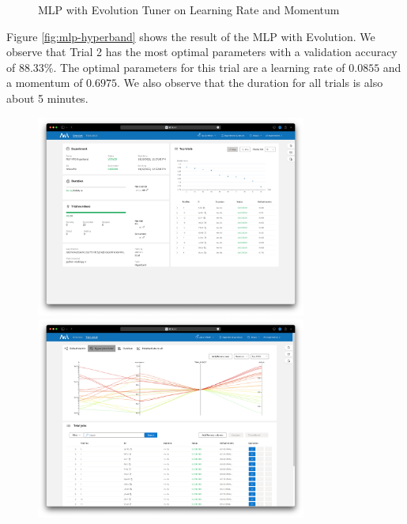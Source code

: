 \documentclass{article}
\begin{document}
\begin{figure}
    \caption{MLP with Evolution Tuner on Learning Rate and Momentum}
    \label{fig:mlp-evolution}
\end{figure}

Figure \ref{fig:mlp-hyperband} shows the result of the MLP with Evolution. We observe that Trial 2 has the most optimal parameters with a validation accuracy of 88.33\%. The optimal parameters for this trial are a learning rate of $0.0855$ and a momentum of $0.6975$. We also observe that the duration for all trials is also about 5 minutes.

\begin{figure}
    \centerline{\includegraphics[width=3.5in]{../proj3/figures/mlp_hyperband_overview.png}\includegraphics[width=3.5in]{../proj3/figures/mlp_hyperband_hyperparameter.png}}

\end{figure}
\end{document}
